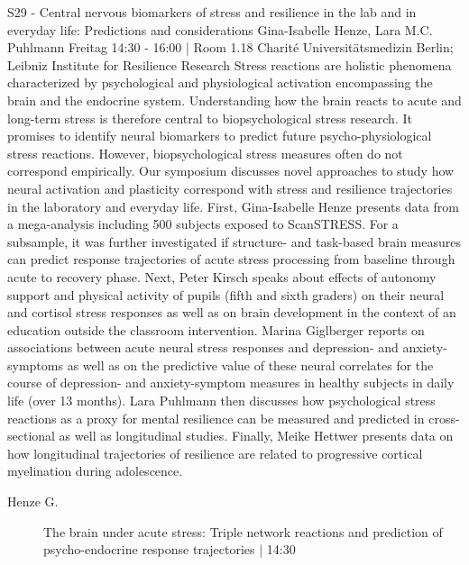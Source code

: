
            \begin{symposium}
            {S29 - Central nervous biomarkers of stress and resilience in the lab and in everyday life: Predictions and considerations }
            {Gina-Isabelle Henze, Lara M.C. Puhlmann}
            {Freitag 14:30 - 16:00 | Room 1.18}
            {Charité Universitätsmedizin Berlin; Leibniz Institute for Resilience Research}
            Stress reactions are holistic phenomena characterized by psychological and physiological activation encompassing the brain and the endocrine system. Understanding how the brain reacts to acute and long-term stress is therefore central to biopsychological stress research. It promises to identify neural biomarkers to predict future psycho-physiological stress reactions. However, biopsychological stress measures often do not correspond empirically. Our symposium discusses novel approaches to study how neural activation and plasticity correspond with stress and resilience trajectories in the laboratory and everyday life.
First, Gina-Isabelle Henze presents data from a mega-analysis including 500 subjects exposed to ScanSTRESS. For a subsample, it was further investigated if structure- and task-based brain measures can predict response trajectories of acute stress processing from baseline through acute to recovery phase.
Next, Peter Kirsch speaks about effects of autonomy support and physical activity of pupils (fifth and sixth graders) on their neural and cortisol stress responses as well as on brain development in the context of an education outside the classroom intervention.
Marina Giglberger reports on associations between acute neural stress responses and depression- and anxiety-symptoms as well as on the predictive value of these neural correlates for the course of depression- and anxiety-symptom measures in healthy subjects in daily life (over 13 months).
Lara Puhlmann then discusses how psychological stress reactions as a proxy for mental resilience can be measured and predicted in cross-sectional as well as longitudinal studies.
Finally, Meike Hettwer presents data on how longitudinal trajectories of resilience are related to progressive cortical myelination during adolescence.
            \begin{description}    
            
                \item [ Henze G.] The brain under acute stress: Triple network reactions and prediction of psycho-endocrine response trajectories \textcolor{mygray}{ | 14:30}    
                

\end{description}
\end{symposium}
